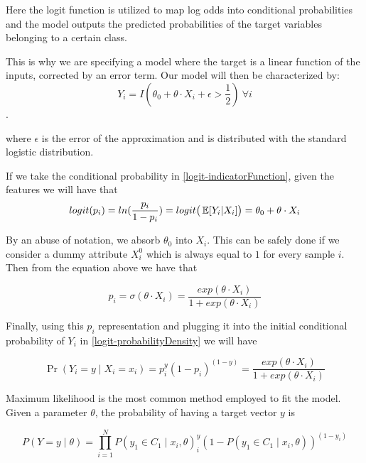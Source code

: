 Here the logit function is utilized to map log odds into conditional probabilities and the model outputs the predicted probabilities of the target variables belonging to a certain class.

This is why we are specifying a model where the target is a linear function of the inputs, corrected by an error term. Our model will then be characterized by:
\begin{equation}\label{logit-indicatorFunction}
Y_i = I(\theta_0 + \theta \cdot X_i + \epsilon > \frac{1}{2}) \ \forall i
\end{equation}. 

where $\epsilon$ is the error of the approximation and is distributed with the standard logistic distribution. %

If we take the conditional probability in \cref{logit-indicatorFunction}, given the features we will have that
\begin{equation}
logit(p_i)= ln(\frac{p_i}{1-p_i}) = logit\big( \operatorname{\mathbb{E}}[Y_i| X_i] \big) = \theta_0 + \theta \cdot X_i
\end{equation}

By an abuse of notation, we absorb $\theta_0$ into $X_i$. This can be safely done if we consider a dummy attribute $X_i^0$ which is always equal to $1$ for every sample $i$. Then from the equation above we have that

\begin{equation}
p_i = \sigma(\theta \cdot X_i) = \frac{exp(\theta \cdot X_i) }{1 + exp(\theta \cdot X_i)}
\end{equation}

Finally, using this $p_i$ representation and plugging it into the initial conditional probability of $Y_i$ in \cref{logit-probabilityDensity} we will have

\begin{equation}
 \Pr(Y_i=y \mid X_i = x_i) = p_i^{y} (1-p_i)^{(1-y)} = \frac{exp(\theta \cdot X_i) }{1 + exp(\theta \cdot X_i)}
 \end{equation}


Maximum likelihood is the most common method employed to fit the model. %
Given a parameter $\theta$, the probability of having a target vector $y$ is

\begin{equation}
P(Y =y \mid \theta ) = \prod_{i=1}^N P(y_1 \in C_1 \mid x_i, \theta)^y_i(1 - P(y_1 \in C_1 \mid x_i, \theta) )^{(1-y_i)}
\end{equation}

